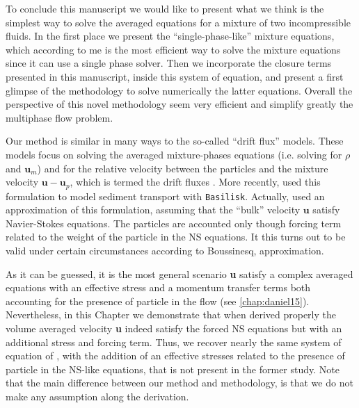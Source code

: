 To conclude this manuscript we would like to present what we think is the simplest way to solve the averaged equations for a mixture of two incompressible fluids.
In the first place we present the ``single-phase-like'' mixture equations, which according to me is the most efficient way to solve the mixture equations since it can use a single phase solver. 
Then we incorporate the closure terms presented in this manuscript, inside this system of equation, and present a first glimpse of the methodology to solve numerically the latter equations.
Overall the perspective of this novel methodology seem very efficient and simplify greatly the multiphase flow problem.  %



Our method is similar in many ways to the so-called ``drift flux'' models. 
These models focus on solving the averaged mixture-phases equations (i.e. solving for $\rho$ and $\textbf{u}_m$) and for the relative velocity between the particles and the mixture velocity $\textbf{u}- \textbf{u}_p$, which is termed the drift fluxes \citep{ishii1977one,guazzelli2011}.  
More recently,  \citet{kriaa2023two} used this formulation to model sediment transport with \texttt{Basilisk}.
Actually, \citet{kriaa2023two} used an approximation of this formulation, assuming that the ``bulk'' velocity $\textbf{u}$ satisfy Navier-Stokes equations.
The particles are accounted only though forcing term related to the weight of the particle in the NS equations. 
It this turns out to be valid under certain circumstances  according to Boussinesq, approximation. 

As it can be guessed, it is the most general scenario \textbf{u} satisfy a complex averaged equations with an effective stress and a momentum transfer terms both accounting for the presence of particle in the flow (see \ref{chap:daniel15}).  
Nevertheless, in this Chapter we demonstrate that when derived properly the volume averaged velocity \textbf{u} indeed satisfy the forced NS equations but with an additional stress and forcing term. 
Thus, we recover nearly the same system of equation of \citet{kriaa2023two}, with the addition of an effective stresses related to the presence of particle in the NS-like equations, that is not present in the former study.
Note that the main difference between our method and \citet{kriaa2023two} methodology, is that we do not make any assumption along the derivation. 

